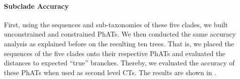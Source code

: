 \paragraph{Subclade Accuracy}
\label{ch:AutomaticTrees:sec:Evaluation:sub:MultilevelPlacement:par:SubcladeAccuracy}

First, using the  sequences and sub-taxonomies of these five clades,
we built unconstrained and constrained \acp{PhAT}.
We then conducted the same accuracy analysis as explained before on the resulting ten trees.
That is, we placed the  sequences of the five clades onto their respective \acp{PhAT}
and evaluated the distances to expected ``true'' branches.
Thereby, we evaluated the accuracy of these \acp{PhAT} when used as second level \aclp{CT}.
The results are shown in .

